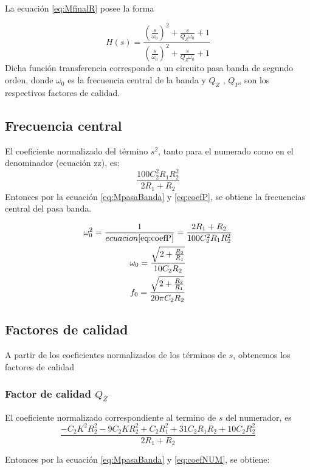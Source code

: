 \documentclass[../../tc_tp3_main.tex]{subfiles}
\begin{document}
La ecuaci\'on \ref{eq:MfinalR} posee la forma

\begin{equation}
H(s)=\frac {\left( \frac{s}{\omega_0} \right) ^2 + \frac{s}{Q_Z \omega_0} +1}{\left( \frac{s}{\omega_0} \right) ^2 +\frac{s}{Q_Z \omega_0}+1} \label{eq:MpasaBanda}
\end{equation}
Dicha función transferencia corresponde a un circuito pasa banda de segundo orden, donde $\omega_0$ es la frecuencia central de la banda y $Q_Z$ , $Q_P$, son los respectivos factores de calidad.
\subsection{Frecuencia central}
El coeficiente normalizado del término $s^2$, tanto para el numerado como en el denominador (ecuación zz), es:
\begin{equation}
\frac{100 C_{2}^2 R_{1} R_{2} ^2}{2R_1+R_2}  \label{eq:coefP}
\end{equation}
Entonces por la ecuación \ref{eq:MpasaBanda} y \ref{eq:coefP}, se obtiene la frecuencias central del pasa banda.

\begin{gather}
\omega_0^2=\frac{1}{ecuacion \ref{eq:coefP}}=\frac{2R_1+R_2}{100 C_{2}^2 R_{1} R_{2} ^2}   \\
\omega_0=\frac{\sqrt{2+\frac{R_2}{R_1}}}{10C_2 R_2}\\
f_0=\frac{\sqrt{2+\frac{R_2}{R_1}}}{20 \pi C_2 R_2} \label{eq:MfrecCen}
\end{gather}
\subsection{Factores de calidad}
A partir de los coeficientes normalizados de los términos de $s$, obtenemos los factores de calidad




\subsubsection{Factor de calidad $Q_Z$}
El coeficiente normalizado correspondiente al termino de $s$ del numerador, es
\begin{equation}
\frac{-C_2 K ^2 R_2^2 - 9  C_2 K R_2 ^2 + C_2 R_1^2 +31 C_2 R_1 R_2+10 C_2 R_2^2}{2R_1 +R_2} \label{eq:coefNUM}
\end{equation}


Entonces por la ecuación \ref{eq:MpasaBanda} y \ref{eq:coefNUM}, se obtiene:
\end{document}
